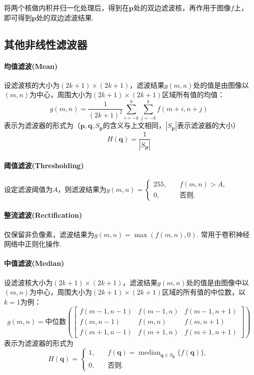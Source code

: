 \documentclass[12pt, a4paper, oneside]{ctexart}
\numberwithin{equation}{section}  %
\theoremstyle{definition}
\def\bd{\boldsymbol}        %
\begin{document}
将两个核做内积并归一化处理后，得到在$\bd{p}$处的双边滤波核，再作用于图像$f$上，即可得到$\bd{p}$处的双边滤波结果.
\subsection{其他非线性滤波器}
\paragraph{均值滤波(Mean)}设滤波核的大小为$(2k+1)\times (2k+1)$，滤波结果$g(m,n)$处的值是由图像以$(m,n)$为中心，周围大小为$(2k+1)\times (2k+1)$区域所有值的均值：
\begin{equation*}
    g(m,n) = \frac{1}{(2k+1)^2}\sum_{i=-k}^{k}\sum_{j=-k}^{k}f(m+i,n+j)
\end{equation*}
表示为滤波器的形式为（$\bd{p},\bd{q},S_{\bd{p}}$的含义与上文相同，$|S_{\bd{p}}|$表示滤波器的大小）
\begin{equation*}
    H(\bd{q}) = \frac{1}{|S_{\bd{p}}|}
\end{equation*}
\paragraph{阈值滤波(Thresholding)}
设定滤波阈值为$A$，则滤波结果为$g(m,n) = \begin{cases}
    255, &\quad f(m,n) > A,\\
    0,&\quad \text{否则}.
\end{cases}$
\paragraph{整流滤波(Rectification)}
仅保留非负像素，滤波结果为$g(m,n) = \max(f(m,n),0)$. 常用于卷积神经网络中正则化操作.
\paragraph{中值滤波(Median)}
设滤波核大小为$(2k+1)\times(2k+1)$，滤波结果$g(m,n)$处的值是由图像中以$(m,n)$为中心，周围大小为$(2k+1)\times(2k+1)$区域的所有值的中位数，以$k=1$为例：
\begin{equation*}
    g(m,n) = \text{中位数}\left(\left[\begin{matrix}
        f(m-1,n-1)&f(m-1,n)&f(m-1,n+1)\\
        f(m,n-1)&f(m,n)&f(m,n+1)\\
        f(m+1,n-1)&f(m+1,n)&f(m+1,n+1)
    \end{matrix}\right]\right)
\end{equation*}
表示为滤波器的形式为
\begin{equation*}
    H(\bd{q}) = \begin{cases}
        1,&\quad f(\bd{q}) = \mathop{median}_{\bd{q}\in S_{\bd{p}}}\{f(\bd{q})\},\\
        0,&\quad \text{否则}.
    \end{cases}
\end{equation*}
\end{document}

